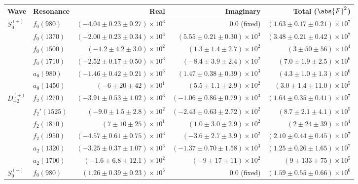 \begin{table}[ht]
    \begin{center}
        \begin{tabular}{llrrr}\toprule
        Wave & Resonance & Real & Imaginary & Total ($\abs{F}^2$) \\\midrule
$S_{0}^{(+)}$ & $f_{0}(980)$ & $(-4.04 \pm 0.23 \pm 0.27) \times 10^{3}$ & $0.0$ (fixed) & $(1.63 \pm 0.17 \pm 0.21) \times 10^{7}$ \\
 & $f_{0}(1370)$ & $(-2.00 \pm 0.23 \pm 0.34) \times 10^{3}$ & $(5.55 \pm 0.21 \pm 0.30) \times 10^{3}$ & $(3.48 \pm 0.21 \pm 0.42) \times 10^{7}$ \\
 & $f_{0}(1500)$ & $(-1.2 \pm 4.2 \pm 3.0) \times 10^{2}$ & $(1.3 \pm 1.4 \pm 2.7) \times 10^{2}$ & $(3 \pm 50 \pm 56) \times 10^{4}$ \\
 & $f_{0}(1710)$ & $(-2.52 \pm 0.17 \pm 0.50) \times 10^{3}$ & $(-8.4 \pm 3.9 \pm 2.4) \times 10^{2}$ & $(7.0 \pm 1.9 \pm 2.5) \times 10^{6}$ \\
 & $a_{0}(980)$ & $(-1.46 \pm 0.42 \pm 0.21) \times 10^{3}$ & $(1.47 \pm 0.38 \pm 0.39) \times 10^{3}$ & $(4.3 \pm 1.0 \pm 1.3) \times 10^{6}$ \\
 & $a_{0}(1450)$ & $(-6 \pm 20 \pm 42) \times 10^{1}$ & $(5.5 \pm 1.1 \pm 2.9) \times 10^{2}$ & $(3.0 \pm 1.4 \pm 11.0) \times 10^{5}$ \\
$D_{+2}^{(+)}$ & $f_{2}(1270)$ & $(-3.91 \pm 0.53 \pm 1.02) \times 10^{3}$ & $(-1.06 \pm 0.86 \pm 0.79) \times 10^{3}$ & $(1.64 \pm 0.35 \pm 0.41) \times 10^{7}$ \\
 & $f_{2}'(1525)$ & $(-9.0 \pm 1.5 \pm 2.8) \times 10^{2}$ & $(-2.43 \pm 0.63 \pm 2.72) \times 10^{2}$ & $(8.7 \pm 2.1 \pm 4.1) \times 10^{5}$ \\
 & $f_{2}(1810)$ & $(7 \pm 10 \pm 25) \times 10^{1}$ & $(1.0 \pm 3.0 \pm 2.9) \times 10^{2}$ & $(2 \pm 24 \pm 39) \times 10^{4}$ \\
 & $f_{2}(1950)$ & $(-4.57 \pm 0.61 \pm 0.75) \times 10^{3}$ & $(-3.6 \pm 2.7 \pm 3.9) \times 10^{2}$ & $(2.10 \pm 0.44 \pm 0.45) \times 10^{7}$ \\
 & $a_{2}(1320)$ & $(-3.25 \pm 0.37 \pm 1.07) \times 10^{3}$ & $(-1.37 \pm 0.70 \pm 1.58) \times 10^{3}$ & $(1.25 \pm 0.26 \pm 1.65) \times 10^{7}$ \\
 & $a_{2}(1700)$ & $(-1.6 \pm 6.8 \pm 12.1) \times 10^{2}$ & $(-9 \pm 17 \pm 11) \times 10^{2}$ & $(9 \pm 133 \pm 75) \times 10^{5}$ \\
$S_{0}^{(-)}$ & $f_{0}(980)$ & $(1.26 \pm 0.39 \pm 0.23) \times 10^{3}$ & $0.0$ (fixed) & $(1.59 \pm 0.55 \pm 0.66) \times 10^{6}$ \\

\end{tabular}
\end{center}
\end{table}
